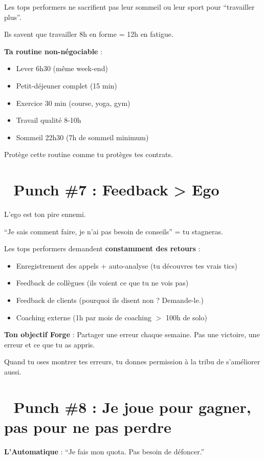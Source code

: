 \documentclass[12pt,a4paper,openany]{book}
\begin{document}
Les tops performers ne sacrifient pas leur sommeil ou leur sport pour ``travailler plus''.

Ils savent que travailler 8h en forme = 12h en fatigue.

\textbf{Ta routine non-négociable} :
\begin{itemize}
\item Lever 6h30 (même week-end)
\item Petit-déjeuner complet (15 min)
\item Exercice 30 min (course, yoga, gym)
\item Travail qualité 8-10h
\item Sommeil 22h30 (7h de sommeil minimum)
\end{itemize}

Protège cette routine comme tu protèges tes contrats.

\section*{🥊 Punch \#7 : Feedback > Ego}

L'ego est ton pire ennemi.

``Je sais comment faire, je n'ai pas besoin de conseils'' = tu stagneras.

Les tops performers demandent \textbf{constamment des retours} :

\begin{itemize}
\item Enregistrement des appels + auto-analyse (tu découvres tes vrais tics)
\item Feedback de collègues (ils voient ce que tu ne vois pas)
\item Feedback de clients (pourquoi ils disent non ? Demande-le.)
\item Coaching externe (1h par mois de coaching $>$ 100h de solo)
\end{itemize}

\textbf{Ton objectif Forge} : Partager une erreur chaque semaine. Pas une victoire, une erreur et ce que tu as appris.

Quand tu oses montrer tes erreurs, tu donnes permission à la tribu de s'améliorer aussi.

\section*{🥊 Punch \#8 : Je joue pour gagner, pas pour ne pas perdre}

\textbf{L'Automatique} : ``Je fais mon quota. Pas besoin de défoncer.''
\end{document}
